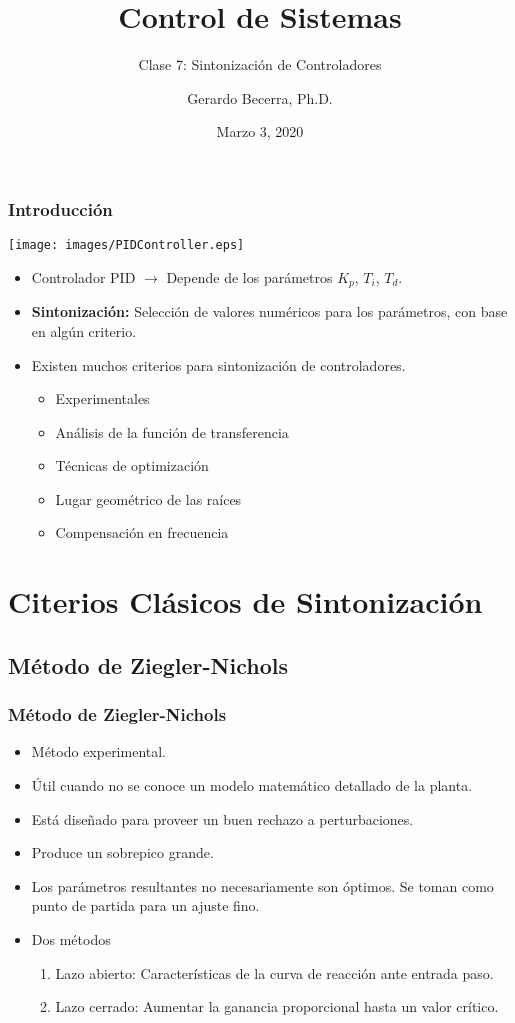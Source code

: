 \documentclass[aspectratio=169,handout]{beamer}
\title{Control de Sistemas}
\subtitle{\small Clase 7: Sintonización de Controladores}
\author{Gerardo Becerra, Ph.D.}
\institute{Pontificia Universidad Javeriana\\ Departamento de Electrónica}
\date{Marzo 3, 2020}
\theoremstyle{definition}
\theoremstyle{plain}
\theoremstyle{remark}
\begin{document}
\frame{\titlepage}	


\begin{frame}[<+->]\frametitle{Introducción}
\vspace*{5mm}
\centering
\texttt{[image: images/PIDController.eps]}
\begin{itemize}
	\item Controlador PID $\rightarrow$ Depende de los parámetros $K_p$, $T_i$, $T_d$.
	\item \textbf{Sintonización:} Selección de valores numéricos para los parámetros, con base en algún criterio.
	\item Existen muchos criterios para sintonización de controladores.
	\begin{itemize}
		\item Experimentales
		\item Análisis de la función de transferencia
		\item Técnicas de optimización
		\item Lugar geométrico de las raíces
		\item Compensación en frecuencia
	\end{itemize}
\end{itemize}
\end{frame}

\section{Citerios Clásicos de Sintonización}
\subsection{Método de Ziegler-Nichols}
\begin{frame}[<+->]\frametitle{Método de Ziegler-Nichols}
\begin{itemize}
	\item Método experimental.
	\item Útil cuando no se conoce un modelo matemático detallado de la planta.
	\item Está diseñado para proveer un buen rechazo a perturbaciones.
	\item Produce un sobrepico grande.
	\item Los parámetros resultantes no necesariamente son óptimos. Se toman como punto de partida para un ajuste fino.
	\item Dos métodos
	\begin{enumerate}
		\item Lazo abierto: Características de la curva de reacción ante entrada paso.
		\item Lazo cerrado: Aumentar la ganancia proporcional hasta un valor crítico.
	\end{enumerate}
\end{itemize}
\end{frame}
\end{document}
